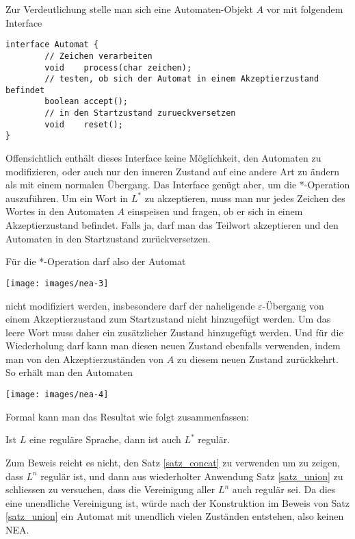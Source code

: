 Zur Verdeutlichung stelle man sich eine Automaten-Objekt $A$ vor mit
folgendem Interface
\begin{verbatim}
interface Automat {
        // Zeichen verarbeiten
        void    process(char zeichen);
        // testen, ob sich der Automat in einem Akzeptierzustand befindet
        boolean accept();
        // in den Startzustand zurueckversetzen
        void    reset();
}
\end{verbatim}
Offensichtlich enthält dieses Interface keine Möglichkeit, den Automaten
zu modifizieren, oder auch nur den inneren Zustand auf eine andere Art
zu ändern als mit einem normalen Übergang.
Das Interface genügt aber, um die *-Operation auszuführen.
Um ein Wort in $L^*$ zu akzeptieren, muss man nur jedes Zeichen
des Wortes in den Automaten $A$ einspeisen und fragen, ob er sich
in einem Akzeptierzustand befindet.
Falls ja, darf man das Teilwort
akzeptieren und den Automaten in den Startzustand zurückversetzen.

Für die *-Operation darf also der Automat
\begin{center}
\texttt{[image: images/nea-3]}
\end{center}
nicht modifiziert werden, insbesondere darf der naheligende
$\varepsilon$-Übergang von einem Akzeptierzustand zum Startzustand
nicht hinzugefügt werden.
Um das leere Wort muss daher ein zusätzlicher Zustand hinzugefügt werden.
Und für die Wiederholung darf kann man diesen neuen Zustand ebenfalls
verwenden, indem man von den Akzeptierzuständen von $A$ zu diesem
neuen Zustand zurückkehrt.
So erhält man den Automaten
\begin{center}
\texttt{[image: images/nea-4]}
\end{center}

Formal kann man das Resultat wie folgt zusammenfassen:
\begin{satz}
%
\label{satz_star}
Ist $L$ eine reguläre Sprache, dann ist auch $L^*$ regulär.
\end{satz}

Zum Beweis reicht es nicht, den Satz \ref{satz_concat} zu verwenden
um zu zeigen, dass $L^n$ regulär ist, und dann aus wiederholter
Anwendung Satz \ref{satz_union} zu schliessen zu versuchen,
dass die Vereinigung aller $L^n$ auch regulär sei.
Da dies eine unendliche
Vereinigung ist, würde nach der Konstruktion im Beweis von Satz
\ref{satz_union} ein Automat mit unendlich vielen
Zuständen entstehen, also keinen NEA.

